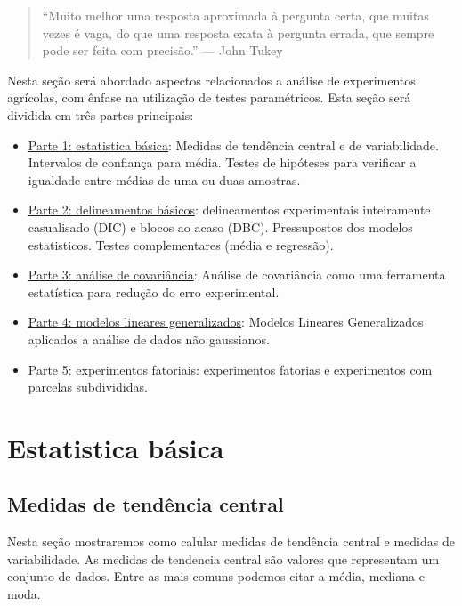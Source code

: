 \documentclass[
]{book}
\numberwithin{equation}{section}
\newcommand{\indt}[1]{\index{#1|ST}}
\begin{document}
\begin{quote}
``Muito melhor uma resposta aproximada à pergunta certa, que muitas vezes é vaga, do que uma resposta exata à pergunta errada, que sempre pode ser feita com precisão.'' --- John Tukey
\end{quote}

Nesta seção será abordado aspectos relacionados a análise de experimentos agrícolas, com ênfase na utilização de testes paramétricos. Esta seção será dividida em três partes principais:

\begin{itemize}
\item
  \protect\hyperlink{ebasic}{Parte 1: estatistica básica}: Medidas de tendência central e de variabilidade. Intervalos de confiança para média. Testes de hipóteses para verificar a igualdade entre médias de uma ou duas amostras.
\item
  \protect\hyperlink{dbasic}{Parte 2: delineamentos básicos}: delineamentos experimentais inteiramente casualisado (DIC) e blocos ao acaso (DBC). Pressupostos \indt{pressupostos} dos modelos estatisticos. Testes complementares (média e regressão).
\item
  \protect\hyperlink{ancova}{Parte 3: análise de covariância}: Análise de covariância como uma ferramenta estatística para redução do erro experimental.
\item
  \protect\hyperlink{general}{Parte 4: modelos lineares generalizados}: Modelos Lineares Generalizados aplicados a análise de dados não gaussianos.
\item
  \protect\hyperlink{efat}{Parte 5: experimentos fatoriais}: experimentos fatorias e experimentos com parcelas subdivididas.
\end{itemize}

\hypertarget{ebasic}{%
\section{Estatistica básica}\label{ebasic}}

\hypertarget{medidas-de-tenduxeancia-central}{%
\subsection{Medidas de tendência central}\label{medidas-de-tenduxeancia-central}}

Nesta seção mostraremos como calular medidas de tendência central e medidas de variabilidade. As medidas de tendencia central são valores que representam um conjunto de dados. Entre as mais comuns podemos citar a média, mediana e moda.
\end{document}
